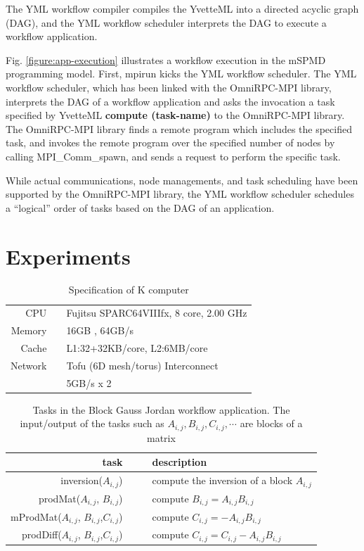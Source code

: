 \documentclass[graybox]{svmult}
\begin{document}
The YML workflow compiler compiles the YvetteML into a directed acyclic graph (DAG), and the YML workflow scheduler interprets the DAG to execute a workflow application. 

Fig. \ref{figure:app-execution} illustrates a workflow execution in the mSPMD programming model. 
First, mpirun kicks the YML workflow scheduler. The YML workflow scheduler, which has been linked with the OmniRPC-MPI library, interprets the DAG of a workflow application and asks the invocation a task specified by YvetteML {\bf compute (task-name)} to the OmniRPC-MPI library. The OmniRPC-MPI library finds a remote program which includes the specified task, and invokes the remote program over the specified number of nodes by calling MPI\_Comm\_spawn, and sends a request to perform the specific task. 

While actual communications, node managements, and task scheduling have been supported by the OmniRPC-MPI library, the YML workflow scheduler schedules a ``logical'' order of tasks based on the DAG of an application.

\section{Experiments} 
\label{section:experiment}

\begin{table}[t]
\begin{center}
 \caption{Specification of K computer}
 \label{table:k-spec}
\begin{tabular}[t]{rrl}\hline\hline
 CPU & &Fujitsu SPARC64VIIIfx, 8 core, 2.00 GHz\\
Memory && 16GB , 64GB/s \\
Cache  && L1:32+32KB/core,  L2:6MB/core \\
Network & & Tofu (6D mesh/torus) Interconnect \\
        & & 5GB/s x 2 \\\hline
\end{tabular}
\end{center}
\end{table}

\begin{table}[t]
\begin{center}
\caption{Tasks in the Block Gauss Jordan workflow application. The input/output of the tasks such as $A_{i,j}, B_{i,j}, C_{i,j}, \cdots $ are blocks of a matrix }
\label{table:tasks}
\begin{tabular}[t]{rrl}\hline\hline
task&  & description \\\hline
inversion($A_{i,j}$) & ~~&compute the inversion of a block $A_{i,j}$ \\
prodMat($A_{i,j}$, $B_{i,j}$)& & compute $B_{i,j} =A_{i,j} B_{i,j}$ \\
mProdMat($A_{i,j}$, $B_{i,j}$,$C_{i,j}$) & &compute $C_{i,j} = - A_{i,j} B_{i,j}$\\
prodDiff($A_{i,j}$, $B_{i,j}$,$C_{i,j}$)  & &compute $C_{i,j} = C_{i,j}- A_{i,j} B_{i,j}$\\\hline
\end{tabular}

\end{center}\end{table}
\end{document}
